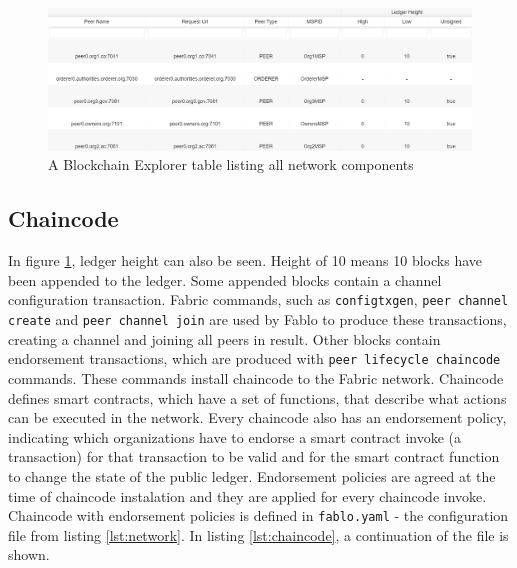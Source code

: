 \documentclass[12pt]{article}
\begin{document}
    \begin{figure}[H]
        \includegraphics[width=\textwidth]{network.png}
        \caption{A Blockchain Explorer table listing all network components}
        \label{fig:network}
    \end{figure}


    \subsection{Chaincode}
    In figure \ref{fig:network}, ledger height can also be seen. Height of 10 means 10 blocks have been appended to the ledger. Some appended blocks contain a channel configuration transaction. Fabric commands, such as \lstinline{configtxgen}, \lstinline{peer channel create} and \lstinline{peer channel join} are used by Fablo to produce these transactions, creating a channel and joining all peers in result. Other blocks contain endorsement transactions, which are produced with \lstinline{peer lifecycle chaincode} commands. These commands install chaincode to the Fabric network. Chaincode defines smart contracts, which have a set of functions, that describe what actions can be executed in the network. Every chaincode also has an endorsement policy, indicating which organizations have to endorse a smart contract invoke (a transaction) for that transaction to be valid and for the smart contract function to change the state of the public ledger. Endorsement policies are agreed at the time of chaincode instalation and they are applied for every chaincode invoke. Chaincode with endorsement policies is defined in \lstinline{fablo.yaml} - the configuration file from listing \ref{lst:network}. In listing \ref{lst:chaincode}, a continuation of the file is shown.
\end{document}
